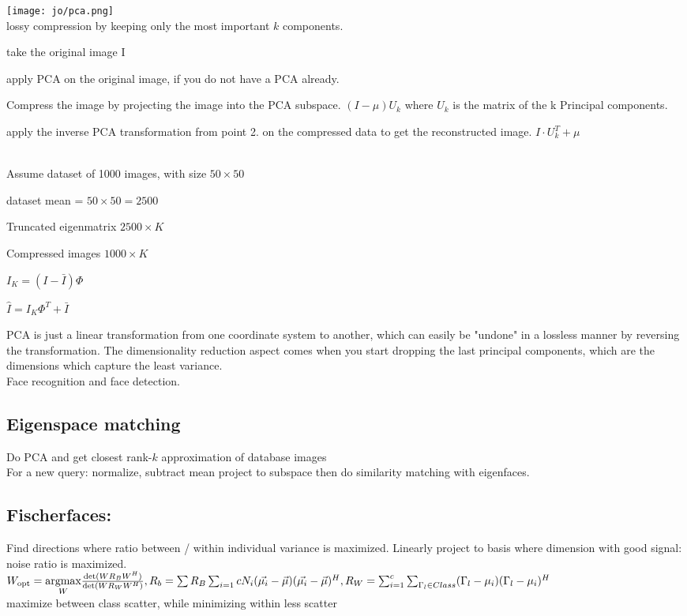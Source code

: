 \texttt{[image: jo/pca.png]}\\
 lossy compression by keeping only the most important $k$ components.
\begin{compactitem}
    \item take the original image I
    \item apply PCA on the original image, if you do not have a PCA already.
    \item Compress the image by projecting the image into the PCA subspace. $(I - \mu)U_k$ where $U_k$ is the matrix of the k Principal components.
    \item apply the inverse PCA 
    transformation from point 2. on the compressed data to get the reconstructed image. $I \cdot U_k^T + \mu$
\end{compactitem}
\\
Assume dataset of 1000 images, with size $50 \times 50$
\begin{compactenum}
    \item dataset mean = $50 \times 50 = 2500$
    \item Truncated eigenmatrix $2500 \times K$
    \item Compressed images $1000 \times K$
    \item $I_K = (I - \bar{I})\Phi$
    \item $\hat{I} = I_K \Phi^T + \bar{I}$
\end{compactenum}
PCA is just a linear transformation from one coordinate system to another, which can easily be "undone" in a lossless manner by reversing the transformation. The dimensionality reduction aspect comes when you start dropping the last principal components, which are the dimensions which capture the least variance.\\
Face recognition  and face detection.
\subsection*{Eigenspace matching}
Do PCA  and get closest rank-$k$ approximation of database images  \\
For a new query: normalize, subtract mean  project to subspace then do similarity matching with eigenfaces.
\subsection{Fischerfaces:} 
Find directions where ratio between / within individual variance is maximized. Linearly project to basis where dimension with good signal: noise ratio is maximized. \\
$W_{\text{opt}} = \underset{W}{\text{argmax}} \frac{\det(W R_B W^H)}{\det(W R_W W^H)}, R_b = \sum R_B \sum_{i = 1}{c} N_i (\vec{\mu_i} - \vec{\mu})(\vec{\mu_i} - \vec{\mu})^H, R_W = \sum_{i = 1}^{c} \sum_{\Gamma_l \in Class} (\Gamma_l - \mu_i)(\Gamma_l - \mu_i)^H$\\
 maximize between class scatter, while minimizing within less scatter

